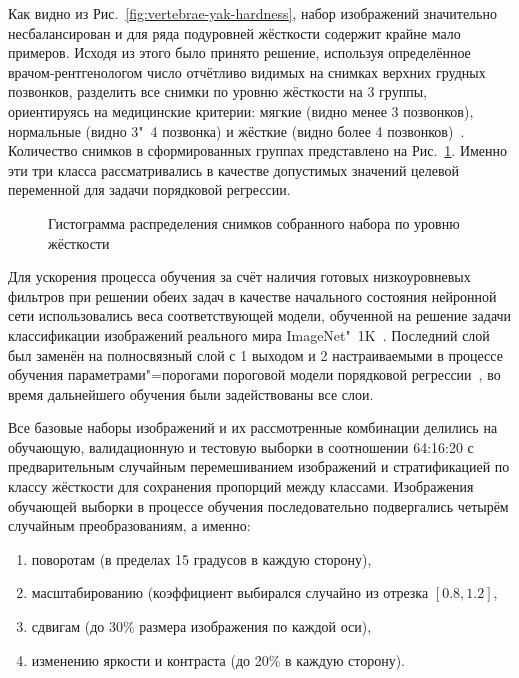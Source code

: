Как видно из Рис.~\ref{fig:vertebrae-yak-hardness}, набор изображений значительно несбалансирован и для ряда подуровней жёсткости содержит крайне мало примеров. Исходя из этого было принято решение, используя определённое врачом-рентгенологом число отчётливо видимых на снимках верхних грудных позвонков, разделить все снимки по уровню жёсткости на 3 группы, ориентируясь на медицинские критерии: мягкие (видно менее 3 позвонков), нормальные (видно 3"~4 позвонка) и жёсткие (видно более 4 позвонков)~\cite{тимофеева2013основные, сидоров2012методика}. Количество снимков в сформированных группах представлено на Рис.~\ref{fig:hardness-yak-hardness}. Именно эти три класса рассматривались в качестве допустимых значений целевой переменной для задачи порядковой регрессии.

\begin{figure}[ht]
	\caption{Гистограмма распределения снимков собранного набора по уровню жёсткости}
	\label{fig:hardness-yak-hardness}
\end{figure}

Для ускорения процесса обучения за счёт наличия готовых низкоуровневых фильтров при решении обеих задач в качестве начального состояния нейронной сети использовались веса соответствующей модели, обученной на решение задачи классификации изображений реального мира ImageNet"~1K~\cite{russakovsky2015imagenet}. Последний слой был заменён на полносвязный слой с 1 выходом и 2 настраиваемыми в процессе обучения параметрами"=порогами пороговой модели порядковой регрессии~\cite{rennie2005loss}, во время дальнейшего обучения были задействованы все слои.

Все базовые наборы изображений и их рассмотренные комбинации делились на обучающую, валидационную и тестовую выборки в соотношении 64:16:20 с предварительным случайным перемешиванием изображений и стратификацией по классу жёсткости для сохранения пропорций между классами. Изображения обучающей выборки в процессе обучения последовательно подвергались четырём случайным преобразованиям, а именно:

\begin{enumerate}
	\item поворотам (в пределах 15 градусов в каждую сторону),
	\item масштабированию (коэффициент выбирался случайно из отрезка $\left[ 0.8, 1.2 \right]$,
	\item сдвигам (до 30\% размера изображения по каждой оси),
	\item изменению яркости и контраста (до 20\% в каждую сторону).
\end{enumerate}

